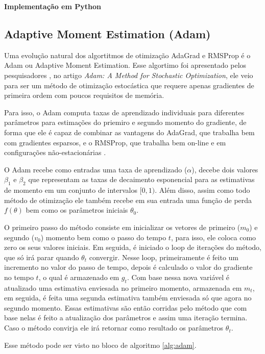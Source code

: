 \textbf{Implementação em Python}

\subsection{Adaptive Moment Estimation (Adam)}

Uma evolução natural dos algortitmos de otimização AdaGrad e RMSProp é o Adam ou Adaptive Moment Estimation. Esse algortimo foi apresentado pelos pesquisadores \textcite{AdamMethod}, no artigo \textit{Adam: A Method for Stochastic Optimization}, ele veio para ser um método de otimização estocástica que requere apenas gradientes de primeira ordem com poucos requisitos de memória.

Para isso, o Adam computa taxas de aprendizado individuais para diferentes parâmetros para estimações do priemiro e segundo momento do gradiente, de forma que ele é capaz de combinar as vantagens do AdaGrad, que trabalha bem com gradientes esparsos, e o RMSProp, que trabalha bem on-line e em configurações não-estacionárias \parencite{AdamMethod}.

O Adam recebe como entradas uma taxa de aprendizado ($\alpha$), decebe dois valores $\beta_1$ e $\beta_2$ que representam as taxas de decaimento esponencial para as estimativas de momento em um conjunto de intervalos $[0, 1)$. Além disso, assim como todo método de otimização ele também recebe em sua entrada uma função de perda $f(\theta)$ bem como os parâmetros iniciais $\theta_0$.

O primeiro passo do método consiste em inicializar os vetores de primeiro ($m_0$) e segundo ($v_0$) momento bem como o passo do tempo $t$, para isso, ele coloca como zero os seus valores iniciais. Em seguida, é iniciado o loop de iterações do método, que só irá parar quando $\theta_t$ convergir. Nesse loop, primeiramente é feito um incremento no valor do passo de tempo, depois é calculado o valor do gradiente no tempo $t$, o qual é armazenado em $g_t$. Com base nessa nova variável é atualizado uma estimativa enviesada no primeiro momento, armazenada em $m_t$, em seguida, é feita uma segunda estimativa também enviesada só que agora no segundo momento. Essas estimativas são então corridas pelo método que com base nelas é feito a atualização dos parâmetros e assim uma iteração termina. Caso o método convirja ele irá retornar como resultado os parâmetros $\theta_t$.

Esse método pode ser visto no bloco de algoritmo \ref{alg:adam}.


